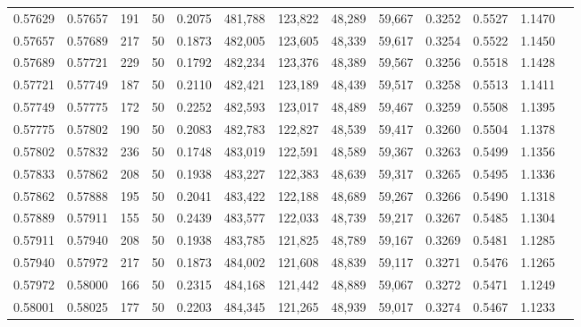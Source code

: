 \begin{tabular}{rrrrrrrrrrrrr}
0.57629 & 0.57657 &   191 &  50 &                                     0.2075 & 481,788 & 123,822 &  48,289 &  59,667 & 0.3252 & 0.5527 & 1.1470 \\
0.57657 & 0.57689 &   217 &  50 &                                     0.1873 & 482,005 & 123,605 &  48,339 &  59,617 & 0.3254 & 0.5522 & 1.1450 \\
0.57689 & 0.57721 &   229 &  50 &                                     0.1792 & 482,234 & 123,376 &  48,389 &  59,567 & 0.3256 & 0.5518 & 1.1428 \\
0.57721 & 0.57749 &   187 &  50 &                                     0.2110 & 482,421 & 123,189 &  48,439 &  59,517 & 0.3258 & 0.5513 & 1.1411 \\
0.57749 & 0.57775 &   172 &  50 &                                     0.2252 & 482,593 & 123,017 &  48,489 &  59,467 & 0.3259 & 0.5508 & 1.1395 \\
0.57775 & 0.57802 &   190 &  50 &                                     0.2083 & 482,783 & 122,827 &  48,539 &  59,417 & 0.3260 & 0.5504 & 1.1378 \\
0.57802 & 0.57832 &   236 &  50 &                                     0.1748 & 483,019 & 122,591 &  48,589 &  59,367 & 0.3263 & 0.5499 & 1.1356 \\
0.57833 & 0.57862 &   208 &  50 &                                     0.1938 & 483,227 & 122,383 &  48,639 &  59,317 & 0.3265 & 0.5495 & 1.1336 \\
0.57862 & 0.57888 &   195 &  50 &                                     0.2041 & 483,422 & 122,188 &  48,689 &  59,267 & 0.3266 & 0.5490 & 1.1318 \\
0.57889 & 0.57911 &   155 &  50 &                                     0.2439 & 483,577 & 122,033 &  48,739 &  59,217 & 0.3267 & 0.5485 & 1.1304 \\
0.57911 & 0.57940 &   208 &  50 &                                     0.1938 & 483,785 & 121,825 &  48,789 &  59,167 & 0.3269 & 0.5481 & 1.1285 \\
0.57940 & 0.57972 &   217 &  50 &                                     0.1873 & 484,002 & 121,608 &  48,839 &  59,117 & 0.3271 & 0.5476 & 1.1265 \\
0.57972 & 0.58000 &   166 &  50 &                                     0.2315 & 484,168 & 121,442 &  48,889 &  59,067 & 0.3272 & 0.5471 & 1.1249 \\
0.58001 & 0.58025 &   177 &  50 &                                     0.2203 & 484,345 & 121,265 &  48,939 &  59,017 & 0.3274 & 0.5467 & 1.1233 \\

\end{tabular}
